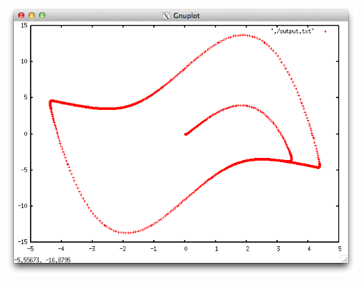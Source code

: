\documentclass[12pt,a4paper]{article}
\begin{document}
\includegraphics[scale=0.5]{third}
\end{document}
